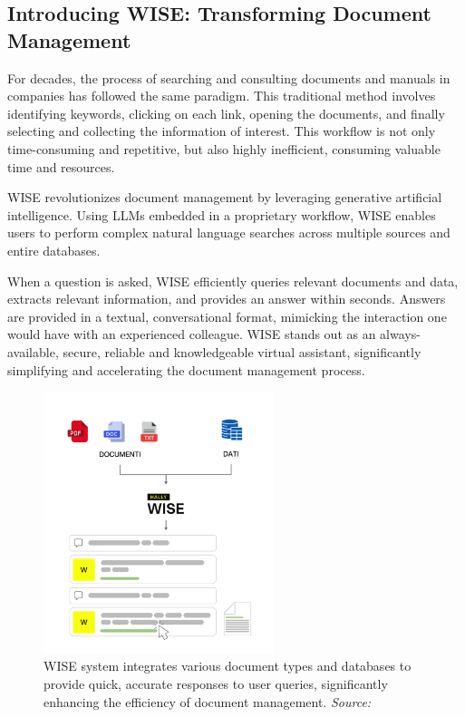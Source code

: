 \subsection{Introducing WISE: Transforming Document Management}

For decades, the process of searching and consulting documents and manuals in companies has followed the same paradigm. This traditional method involves identifying keywords, clicking on each link, opening the documents, and finally selecting and collecting the information of interest. This workflow is not only time-consuming and repetitive, but also highly inefficient, consuming valuable time and resources.

WISE revolutionizes document management by leveraging generative artificial intelligence. Using LLMs embedded in a proprietary workflow, WISE enables users to perform complex natural language searches across multiple sources and entire databases. 

When a question is asked, WISE efficiently queries relevant documents and data, extracts relevant information, and provides an answer within seconds. Answers are provided in a textual, conversational format, mimicking the interaction one would have with an experienced colleague. WISE stands out as an always-available, secure, reliable and knowledgeable virtual assistant, significantly simplifying and accelerating the document management process. \cite{hpa2024}

\begin{figure}[h!]
    \centering
    \includegraphics[width=0.6\textwidth]{images/wise/wise-schema-verticale.png}
    \caption{WISE system integrates various document types and databases to provide quick, accurate responses to user queries, significantly enhancing the efficiency of document management. \textit{Source:} \cite{hpa2024}}
    \label{fig:wise-schema}
\end{figure}

